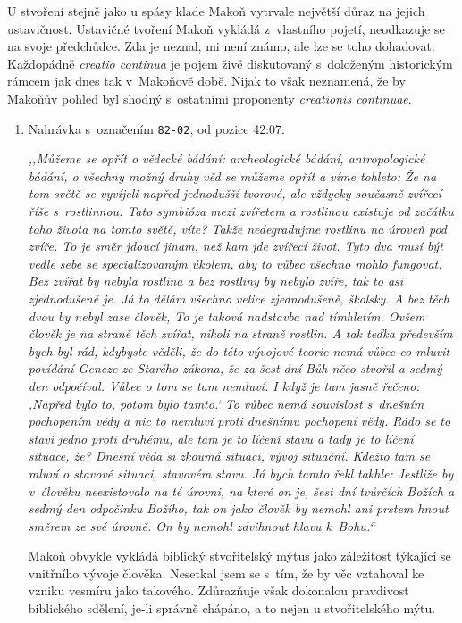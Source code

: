 U stvoření stejně jako u spásy klade Makoň vytrvale největší důraz na jejich
ustavičnost. Ustavičné tvoření Makoň vykládá z~vlastního pojetí, neodkazuje se
na svoje předchůdce. Zda je neznal, mi není známo, ale lze se toho dohadovat.
Každopádně \textit{creatio continua} je pojem živě diskutovaný s~doloženým
historickým rámcem jak dnes\cite{congdon2010creatio}\cite{Salim2022Creatio} tak
v~Makoňově době\cite{marcus1957typen}. Nijak to však neznamená, že by Makoňův
pohled byl shodný s~ostatními proponenty \textit{creationis continuae}.

\begin{enumerate}

\item{
Nahrávka s~označením \texttt{82-02}, od pozice 42:07.

\textit{%
,,Můžeme se opřít o vědecké bádání: archeologické bádání, antropologické bádání,
o všechny možný druhy věd se můžeme opřít a víme tohleto: Že na tom světě se
vyvíjeli napřed jednodušší tvorové, ale vždycky současně zvířecí říše
s~rostlinnou. Tato symbióza mezi zvířetem a rostlinou existuje od začátku toho
života na tomto světě, víte? Takže nedegradujme rostlinu na úroveň pod zvíře. To
je směr jdoucí jinam, než kam jde zvířecí život. Tyto dva musí být vedle sebe se
specializovaným úkolem, aby to vůbec všechno mohlo fungovat. Bez zvířat by
nebyla rostlina a bez rostliny by nebylo zvíře, tak to asi zjednodušeně je. Já
to dělám všechno velice zjednodušeně, školsky. A bez těch dvou by nebyl zase
člověk, To je taková nadstavba nad tímhletím. Ovšem člověk je na straně těch
zvířat, nikoli na straně rostlin. A tak teďka především bych byl rád, kdybyste
věděli, že do této vývojové teorie nemá vůbec co mluvit povídání Geneze ze
Starého zákona, že za šest dní Bůh něco stvořil a sedmý den odpočíval. Vůbec o
tom se tam nemluví. I když je tam jasně řečeno: ,Napřed bylo to, potom bylo
tamto.` To vůbec nemá souvislost s~dnešním pochopením vědy a nic to nemluví
proti dnešnímu pochopení vědy. Rádo se to staví jedno proti druhému, ale tam
je to líčení stavu a tady je to líčení situace, že? Dnešní věda si zkoumá
situaci, vývoj situační. Kdežto tam se mluví o stavové situaci, stavovém stavu.
Já bych tamto řekl takhle: Jestliže by v~člověku neexistovalo na té úrovni, na
které on je, šest dní tvůrčích Božích a sedmý den odpočinku Božího, tak on jako
člověk by nemohl ani prstem hnout směrem ze své úrovně. On by nemohl zdvihnout
hlavu k~Bohu.``
}

Makoň obvykle vykládá biblický stvořitelský mýtus jako záležitost týkající se
        vnitřního vývoje člověka. Nesetkal jsem se s~tím, že by věc vztahoval ke
        vzniku vesmíru jako takového. Zdůrazňuje však dokonalou pravdivost
        biblického sdělení, je-li správně chápáno, a to nejen u stvořitelského
        mýtu.

}
\end{enumerate}
